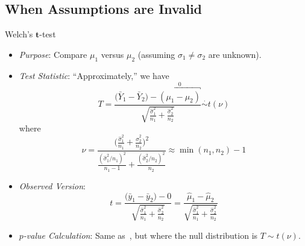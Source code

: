 \subsection{When Assumptions are Invalid}
\begin{Statistical_Test}{Welch's $ \symbf{t} $-test}{}
      \begin{itemize}
            \item \emph{Purpose}: Compare $ \mu_1 $ versus $ \mu_2 $ (assuming $ \sigma_1\ne\sigma_2 $ are unknown).
            \item \emph{Test Statistic}: ``Approximately,'' we have
                  \[ T=\frac{\bigl(\bar{Y}_1-\bar{Y}_2\bigr)-\overbracket{(\mu_1-\mu_2)}^0}{\displaystyle \sqrt{\frac{\hat{\sigma}_1^2}{n_1}+\frac{\hat{\sigma}_2^2}{n_2}}}\stackrel{\cdot}{\sim} t(\nu) \]
                  where
                  \[ \nu=\frac{
                              \displaystyle \biggl(\frac{\hat{\sigma}_1^2}{n_1}+\frac{\hat{\sigma}_2^2}{n_2} \biggr)^{\!2}
                        }{
                              \displaystyle \frac{(\hat{\sigma}_1^2/n_1)^2}{n_1-1}+\frac{(\hat{\sigma}_2^2/n_2)^2}{n_2}
                        }\approx \min(n_1,n_2)-1  \]
            \item \emph{Observed Version}:
                  \[ t=\frac{\bigl(\bar{y}_1-\bar{y}_2\bigr)-0}{\displaystyle \sqrt{\frac{\hat{\sigma}_1^2}{n_1}+\frac{\hat{\sigma}_2^2}{n_2}}}=\frac{\hat{\mu}_1-\hat{\mu}_2}{\displaystyle \sqrt{\frac{\hat{\sigma}_1^2}{n_1}+\frac{\hat{\sigma}_2^2}{n_2}}}  \]
            \item \emph{$ p $-value Calculation}: Same as~, but where
                  the null distribution is $ T \sim t(\nu) $.
      \end{itemize}
\end{Statistical_Test}
